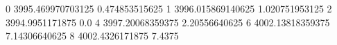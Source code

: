 0 3995.469970703125 0.474853515625
1 3996.015869140625 1.020751953125
2 3994.9951171875 0.0
4 3997.20068359375 2.20556640625
6 4002.13818359375 7.14306640625
8 4002.4326171875 7.4375
